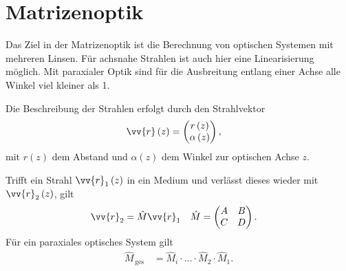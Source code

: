 \documentclass[a4paper,12pt]{article}
\numberwithin{equation}{section}
\begin{document}
\section{Matrizenoptik}
Das Ziel in der Matrizenoptik ist die Berechnung von optischen Systemen mit mehreren Linsen.
Für achsnahe Strahlen ist auch hier eine Linearisierung möglich. 
Mit paraxialer Optik sind für die Ausbreitung entlang einer Achse alle Winkel viel kleiner als 1.\par
Die Beschreibung der Strahlen erfolgt durch den Strahlvektor
\begin{align} 
        \vv{r}\left(z\right)&=\begin{pmatrix}
                r\left(z\right)\\\alpha \left(z\right)
        \end{pmatrix}
,\end{align} 
mit $r\left(z\right)$ dem Abstand und $\alpha \left(z\right)$ dem Winkel zur optischen Achse $z$.\par
Trifft ein Strahl $\vv{r}_1\left(z\right)$ in ein Medium und verlässt dieses wieder mit $\vv{r}_2\left(z\right)$, gilt 
\begin{align} 
        \vv{r}_2&=\hat{M}\vv{r}_1&\hat{M}&=\begin{pmatrix}
                A&B\\C&D
        \end{pmatrix}
.\end{align} 
Für ein paraxiales optisches System gilt
\begin{align} 
        \hat{M}_{\,\text{ges}\,}&=\hat{M}_i\cdot \hdots \cdot \hat{M}_2\cdot \hat{M}_1
.\end{align} 
\end{document}
